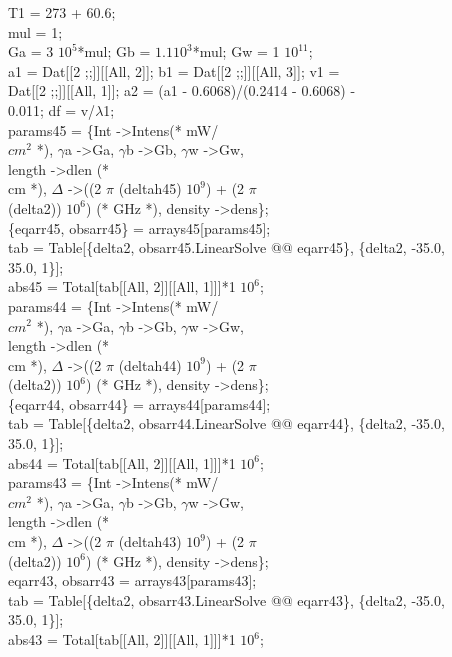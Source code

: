 T1 = 273 + 60.6;\\
mul = 1;\\
Ga = 3 $10^5$*mul; Gb = $1.1 10^3$*mul; Gw = 1 $10^11$;\\
a1 = Dat[[2 ;;]][[All, 2]]; b1 = Dat[[2 ;;]][[All, 3]]; v1 = \\
 Dat[[2 ;;]][[All, 1]]; a2 = (a1 - 0.6068)/(0.2414 - 0.6068) - \\
  0.011; df = v/$\lambda$1;\\
params45 = \{Int -\textgreater Intens(* mW/\\
   $cm^2$ *), $\gamma$a -\textgreater Ga, $\gamma$b -\textgreater Gb, $\gamma$w -\textgreater Gw, \\
   length -\textgreater dlen (* \\
   cm *), $\Delta$ -\textgreater ((2 $\pi$ (deltah45) $10^{9}$) + (2 $\pi$ \ \\
(delta2)) $10^6$) (* GHz *), density -\textgreater dens\};\\
\{eqarr45, obsarr45\} = arrays45[params45];\\
tab = Table[\{delta2, obsarr45.LinearSolve @@ eqarr45\}, \{delta2, -35.0,\\
     35.0, 1\}];\\
abs45 = Total[tab[[All, 2]][[All, 1]]]*1 $10^6$;\\
params44 = \{Int -\textgreater Intens(* mW/\\
   $cm^2$ *), $\gamma$a -\textgreater Ga, $\gamma$b -\textgreater Gb, $\gamma$w -\textgreater Gw, \\
   length -\textgreater dlen (* \\
   cm *), $\Delta$ -\textgreater ((2 $\pi$ (deltah44) $10^9$) + (2 $\pi$\\
(delta2)) $10^6$) (* GHz *), density -\textgreater dens\};\\
\{eqarr44, obsarr44\} = arrays44[params44];\\
tab = Table[\{delta2, obsarr44.LinearSolve @@ eqarr44\}, \{delta2, -35.0,\\
     35.0, 1\}];\\
abs44 = Total[tab[[All, 2]][[All, 1]]]*1 $10^{6}$;\\
params43 = \{Int -\textgreater Intens(* mW/\\
   $cm^2$ *), $\gamma$a -\textgreater Ga, $\gamma$b -\textgreater Gb, $\gamma$w -\textgreater Gw, \\
   length -\textgreater dlen (* \\
   cm *), $\Delta$ -\textgreater ((2 $\pi$ (deltah43) $10^{9}$) + (2 $\pi$ \\
(delta2)) $10^6$) (* GHz *), density -\textgreater dens\};\\
{eqarr43, obsarr43} = arrays43[params43];\\
tab = Table[\{delta2, obsarr43.LinearSolve @@ eqarr43\}, \{delta2, -35.0,\\
     35.0, 1\}];\\
abs43 = Total[tab[[All, 2]][[All, 1]]]*1 $10^{6}$;\\


